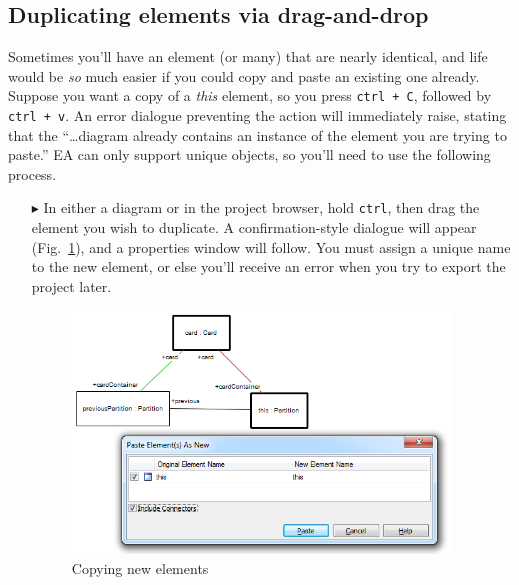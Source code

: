 \newpage

\subsection{Duplicating elements via drag-and-drop}

Sometimes you'll have an element (or many) that are nearly identical, and life would be \emph{so} much easier if you could copy and paste an existing one
already. Suppose you want a copy of a \emph{this} element, so you press \texttt{ctrl + C}, followed by \texttt{ctrl + v}. An error dialogue preventing the
action will immediately raise, stating that the ``\ldots diagram already contains an instance of the element you are trying to paste.'' EA can only support
unique objects, so you'll need to use the following process.

\begin{itemize}

\item[$\blacktriangleright$] In either a diagram or in the project browser, hold \texttt{ctrl}, then drag the element you wish to duplicate. A
confirmation-style dialogue will appear (Fig.~\ref{ea:dupWindow}), and a properties window will follow. You must assign a unique name to the new element, or
else you'll receive an error when you try to export the project later.

\begin{figure}[htbp]
\begin{center}
  \includegraphics[width=0.95\textwidth]{ea_duplicatingElements}
  \caption{Copying new elements}  
  \label{ea:dupWindow}
\end{center}
\end{figure}

\end{itemize}
